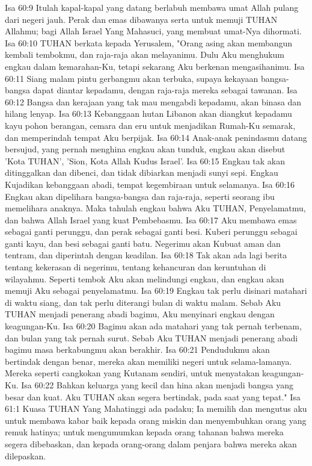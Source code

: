 Isa 60:9  Itulah kapal-kapal yang datang berlabuh membawa umat Allah pulang dari negeri jauh. Perak dan emas dibawanya serta untuk memuji TUHAN Allahmu; bagi Allah Israel Yang Mahasuci, yang membuat umat-Nya dihormati.
Isa 60:10  TUHAN berkata kepada Yerusalem, "Orang asing akan membangun kembali tembokmu, dan raja-raja akan melayanimu. Dulu Aku menghukum engkau dalam kemarahan-Ku, tetapi sekarang Aku berkenan mengasihanimu.
Isa 60:11  Siang malam pintu gerbangmu akan terbuka, supaya kekayaan bangsa-bangsa dapat diantar kepadamu, dengan raja-raja mereka sebagai tawanan.
Isa 60:12  Bangsa dan kerajaan yang tak mau mengabdi kepadamu, akan binasa dan hilang lenyap.
Isa 60:13  Kebanggaan hutan Libanon akan diangkut kepadamu kayu pohon berangan, cemara dan eru untuk menjadikan Rumah-Ku semarak, dan memperindah tempat Aku berpijak.
Isa 60:14  Anak-anak penindasmu datang bersujud, yang pernah menghina engkau akan tunduk, engkau akan disebut 'Kota TUHAN', 'Sion, Kota Allah Kudus Israel'.
Isa 60:15  Engkau tak akan ditinggalkan dan dibenci, dan tidak dibiarkan menjadi sunyi sepi. Engkau Kujadikan kebanggaan abadi, tempat kegembiraan untuk selamanya.
Isa 60:16  Engkau akan dipelihara bangsa-bangsa dan raja-raja, seperti seorang ibu memelihara anaknya. Maka tahulah engkau bahwa Aku TUHAN, Penyelamatmu, dan bahwa Allah Israel yang kuat Pembebasmu.
Isa 60:17  Aku membawa emas sebagai ganti perunggu, dan perak sebagai ganti besi. Kuberi perunggu sebagai ganti kayu, dan besi sebagai ganti batu. Negerimu akan Kubuat aman dan tentram, dan diperintah dengan keadilan.
Isa 60:18  Tak akan ada lagi berita tentang kekerasan di negerimu, tentang kehancuran dan keruntuhan di wilayahmu. Seperti tembok Aku akan melindungi engkau, dan engkau akan memuji Aku sebagai penyelamatmu.
Isa 60:19  Engkau tak perlu disinari matahari di waktu siang, dan tak perlu diterangi bulan di waktu malam. Sebab Aku TUHAN menjadi penerang abadi bagimu, Aku menyinari engkau dengan keagungan-Ku.
Isa 60:20  Bagimu akan ada matahari yang tak pernah terbenam, dan bulan yang tak pernah surut. Sebab Aku TUHAN menjadi penerang abadi bagimu masa berkabungmu akan berakhir.
Isa 60:21  Pendudukmu akan bertindak dengan benar, mereka akan memiliki negeri untuk selama-lamanya. Mereka seperti cangkokan yang Kutanam sendiri, untuk menyatakan keagungan-Ku.
Isa 60:22  Bahkan keluarga yang kecil dan hina akan menjadi bangsa yang besar dan kuat. Aku TUHAN akan segera bertindak, pada saat yang tepat."
Isa 61:1  Kuasa TUHAN Yang Mahatinggi ada padaku; Ia memilih dan mengutus aku untuk membawa kabar baik kepada orang miskin dan menyembuhkan orang yang remuk hatinya; untuk mengumumkan kepada orang tahanan bahwa mereka segera dibebaskan, dan kepada orang-orang dalam penjara bahwa mereka akan dilepaskan.
